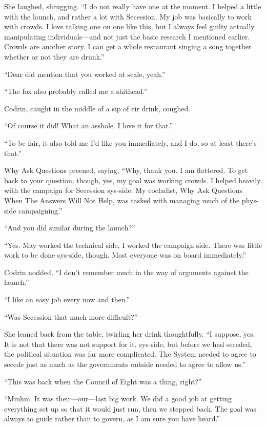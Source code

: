 She laughed, shrugging. ``I do not really have one at the moment. I helped a little with the launch, and rather a lot with Secession. My job was basically to work with crowds. I love talking one on one like this, but I always feel guilty actually manipulating individuals---and not just the basic research I mentioned earlier. Crowds are another story. I can get a whole restaurant singing a song together whether or not they are drunk.''

``Dear did mention that you worked at scale, yeah.''

``The fox also probably called me a shithead.''

Codrin, caught in the middle of a sip of eir drink, coughed.

``Of course it did! What an asshole. I love it for that.''

``To be fair, it also told me I'd like you immediately, and I do, so at least there's that.''

Why Ask Questions preened, saying, ``Why, thank you. I am flattered. To get back to your question, though, yes, my goal was working crowds. I helped heavily with the campaign for Secession sys-side. My cocladist, Why Ask Questions When The Answers Will Not Help, was tasked with managing much of the phys-side campaigning.''

``And you did similar during the launch?''

``Yes. May worked the technical side, I worked the campaign side. There was little work to be done sys-side, though. Most everyone was on board immediately.''

Codrin nodded, ``I don't remember much in the way of arguments against the launch.''

``I like an easy job every now and then.''

``Was Secession that much more difficult?''

She leaned back from the table, twirling her drink thoughtfully. ``I suppose, yes. It is not that there was not support for it, sys-side, but before we had seceded, the political situation was far more complicated. The System needed to agree to secede just as much as the governments outside needed to agree to allow us.''

``This was back when the Council of Eight was a thing, right?''

``Mmhm. It was their---our---last big work. We did a good job at getting everything set up so that it would just run, then we stepped back. The goal was always to guide rather than to govern, as I am sure you have heard.''

